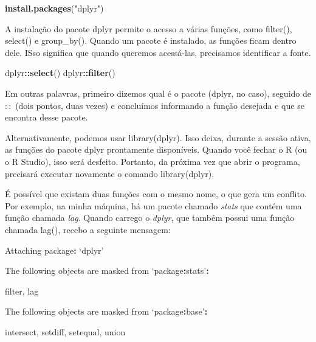 \documentclass[
]{book}
\newenvironment{Shaded}{\begin{snugshade}}{\end{snugshade}}
\newcommand{\KeywordTok}[1]{\textcolor[rgb]{0.13,0.29,0.53}{\textbf{#1}}}
\newcommand{\NormalTok}[1]{#1}
\newcommand{\OperatorTok}[1]{\textcolor[rgb]{0.81,0.36,0.00}{\textbf{#1}}}
\newcommand{\StringTok}[1]{\textcolor[rgb]{0.31,0.60,0.02}{#1}}
\begin{document}
\begin{Shaded}
\begin{Highlighting}[]
\KeywordTok{install.packages}\NormalTok{(}\StringTok{"dplyr"}\NormalTok{)}
\end{Highlighting}
\end{Shaded}

A instalação do pacote dplyr permite o acesso a várias funções, como filter(), select() e group\_by(). Quando um pacote é instalado, as funções ficam dentro dele. ISso significa que quando queremos acessá-las, precisamos identificar a fonte.

\begin{Shaded}
\begin{Highlighting}[]
\NormalTok{dplyr}\OperatorTok{::}\KeywordTok{select}\NormalTok{()}
\NormalTok{dplyr}\OperatorTok{::}\KeywordTok{filter}\NormalTok{()}
\end{Highlighting}
\end{Shaded}

Em outras palavras, primeiro dizemos qual é o pacote (dplyr, no caso), seguido de \(::\) (dois pontos, duas vezes) e concluímos informando a função desejada e que se encontra desse pacote.

Alternativamente, podemos usar library(dplyr). Isso deixa, durante a sessão ativa, as funções do pacote dplyr prontamente disponíveis. Quando você fechar o R (ou o R Studio), isso será desfeito. Portanto, da próxima vez que abrir o programa, precisará executar novamente o comando library(dplyr).

É possível que existam duas funções com o mesmo nome, o que gera um conflito. Por exemplo, na minha máquina, há um pacote chamado \emph{stats} que contém uma função chamada \emph{lag}. Quando carrego o \emph{dplyr}, que também possui uma função chamada lag(), recebo a seguinte mensagem:

\begin{Shaded}
\begin{Highlighting}[]
\NormalTok{Attaching package}\OperatorTok{:}\StringTok{ }\NormalTok{‘dplyr’}

\NormalTok{The following objects are masked from ‘package}\OperatorTok{:}\NormalTok{stats’}\OperatorTok{:}

\StringTok{    }\NormalTok{filter, lag}

\NormalTok{The following objects are masked from ‘package}\OperatorTok{:}\NormalTok{base’}\OperatorTok{:}

\StringTok{    }\NormalTok{intersect, setdiff, setequal, union}
\end{Highlighting}
\end{Shaded}
\end{document}
